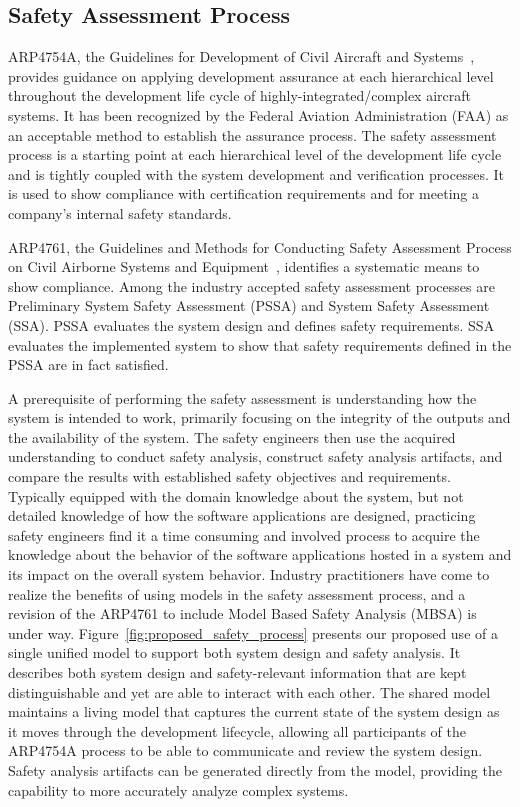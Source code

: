 \subsection{Safety Assessment Process}
\label{subsec:process}

ARP4754A, the Guidelines for Development of Civil Aircraft and Systems~\cite{SAE:ARP4754A}, provides guidance on applying development assurance at each hierarchical level throughout the development life cycle of highly-integrated/complex aircraft systems. It has been recognized by the Federal Aviation Administration (FAA) as an acceptable method to establish the assurance process. The safety assessment process is a starting point at each hierarchical level of the development life cycle and is tightly coupled with the system development and verification processes. It is used to show compliance with certification requirements and for meeting a company's internal safety standards. 

ARP4761, the Guidelines and Methods for Conducting Safety Assessment Process on Civil Airborne Systems and Equipment~\cite{SAE:ARP4761},  identifies a systematic means to show compliance. Among the industry accepted safety assessment processes are Preliminary System Safety Assessment (PSSA) and System Safety Assessment (SSA). PSSA evaluates the system design and defines safety requirements. SSA evaluates the implemented system to show that safety requirements defined in the PSSA are in fact satisfied.

A prerequisite of performing the safety assessment is understanding how the system is intended to work, primarily focusing on the integrity of the outputs and the availability of the system. The safety engineers then use the acquired understanding to conduct safety analysis, construct safety analysis artifacts, and compare the results with established safety objectives and requirements.
Typically equipped with the domain knowledge about the system, but not detailed knowledge of how the software applications are designed, practicing safety engineers find it a time consuming and involved process to acquire the knowledge about the behavior of the software applications hosted in a system and its impact on the overall system behavior.
Industry practitioners have come to realize the benefits of using models in the safety assessment process, and a revision of the ARP4761 to include Model Based Safety Analysis (MBSA) is under way.
Figure~\ref{fig:proposed_safety_process} presents our proposed use of a single unified model to support both system design and safety analysis. It describes both system design and safety-relevant information 
that are kept distinguishable and yet are able to interact with each other. The shared model maintains a living model that captures the current state of the system design as it moves through the development lifecycle, allowing all participants of the ARP4754A process to be able to communicate and review the system design. Safety analysis artifacts can be generated directly from the model, 
providing
the capability to more accurately analyze complex systems.

